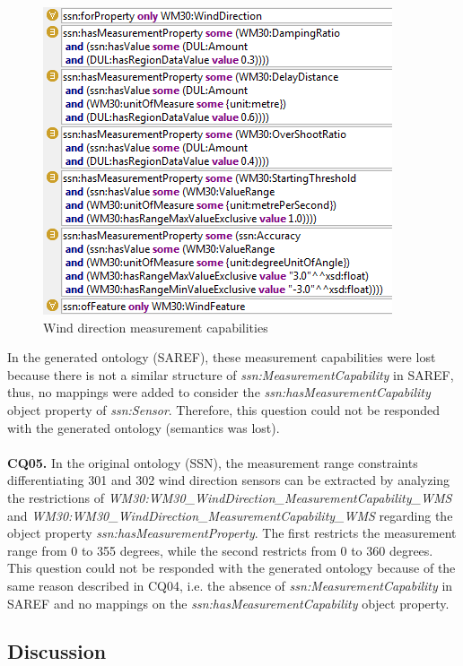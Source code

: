 \documentclass{sig-alternate-05-2015}
\begin{document}
\begin{figure}[h!]
\centering
\includegraphics[scale=0.87]{SSN_MeasurementCapability}
\caption{Wind direction measurement capabilities} 
\label{fig:SSN_MeasurementCapability}
\end{figure}

In the generated ontology (SAREF), these measurement capabilities were lost because there is not a similar structure of \textit{ssn:\-MeasurementCapability} in SAREF, thus, no mappings were added to consider the  \textit{ssn:\-hasMeasurementCapability} object property of \textit{ssn:\-Sensor}. Therefore, this question could not be responded with the generated ontology (semantics was lost).  
\\\\\textbf{CQ05.} In the original ontology (SSN), the measurement range constraints differentiating 301 and 302 wind direction sensors can be extracted by analyzing the restrictions of \textit{WM30:\-WM30\-\_Wind\-Direction\-\_Measurement\-Capability\-\_WMS} and \textit{WM30:\-WM30\-\_Wind\-Direction\-\_Measurement\-Capability\-\_WMS} regarding the object property \textit{ssn:\-has\-Measurement\-Property}. The first restricts the measurement range from 0 to 355 degrees, while the second restricts from 0 to 360 degrees. This question could not be responded with the generated ontology because of the same reason described in CQ04, i.e. the absence of \textit{ssn:\-MeasurementCapability} in SAREF and no mappings on the \textit{ssn:\-hasMeasurementCapability} object property.


\subsection{Discussion}
\end{document}
